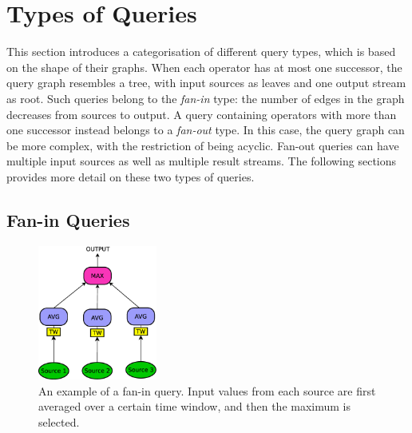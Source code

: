 \section{Types of Queries}
\label{sec:qtypes}



This section introduces a categorisation of different query types, which is
based on the shape of their graphs. When each operator has at most one successor, the query
graph resembles a tree, with input sources as leaves and one output stream as root. Such queries
belong to the \emph{fan-in} type: the number of edges in the graph decreases from sources
to output. 
A query containing operators with more than one successor instead belongs to a \emph{fan-out} type. 
In this case, the query graph can be more complex, with the restriction of being acyclic. Fan-out
queries can have multiple input sources as well as multiple result streams. 
The following sections provides more detail on these two types of queries.

\subsection*{Fan-in Queries}
\label{sec:fan-in}

\DIFdelbegin %
\DIFdelendFL \DIFaddbeginFL \begin{figure}[t]
	\DIFaddendFL \centering
	\includegraphics[width=0.35\textwidth]{img/tesi/query_fanin_senza} 
	\caption{An example of a fan-in query. Input values from each source are first averaged over a certain
	time window, and then the maximum is selected.}
	\label{fig:query_fanin}
\end{figure}


